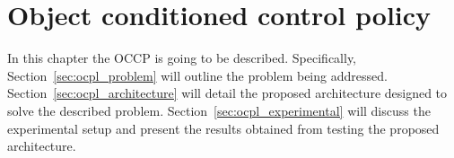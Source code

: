 \chapter{Object conditioned control policy}
\label{ch:occp}
In this chapter the OCCP is going to be described. Specifically, Section~\ref{sec:ocpl_problem} will outline the problem being addressed. Section~\ref{sec:ocpl_architecture} will detail the proposed architecture designed to solve the described problem. Section~\ref{sec:ocpl_experimental} will discuss the experimental setup and present the results obtained from testing the proposed architecture.



